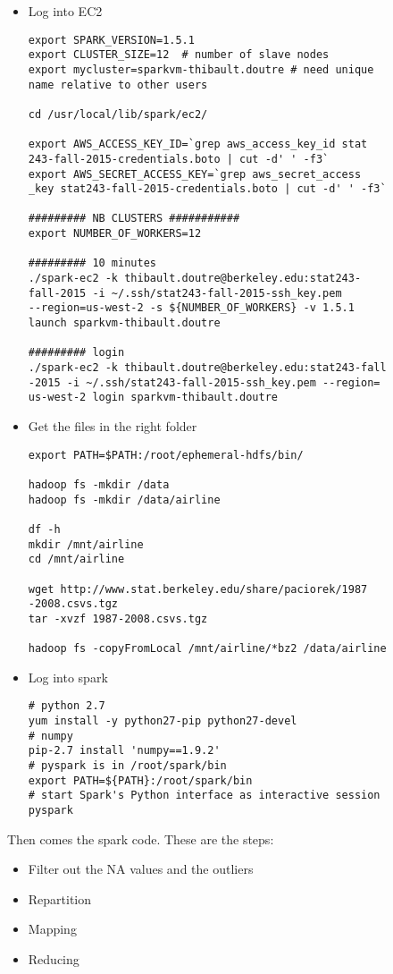 \documentclass{llncs}\usepackage[]{graphicx}\usepackage[]{color}
\begin{document}
\begin{itemize}
\item Log into EC2
\begin{lstlisting}[frame=single] 
export SPARK_VERSION=1.5.1
export CLUSTER_SIZE=12  # number of slave nodes
export mycluster=sparkvm-thibault.doutre # need unique
name relative to other users

cd /usr/local/lib/spark/ec2/

export AWS_ACCESS_KEY_ID=`grep aws_access_key_id stat
243-fall-2015-credentials.boto | cut -d' ' -f3`
export AWS_SECRET_ACCESS_KEY=`grep aws_secret_access
_key stat243-fall-2015-credentials.boto | cut -d' ' -f3`

######### NB CLUSTERS ###########
export NUMBER_OF_WORKERS=12

######### 10 minutes
./spark-ec2 -k thibault.doutre@berkeley.edu:stat243-
fall-2015 -i ~/.ssh/stat243-fall-2015-ssh_key.pem 
--region=us-west-2 -s ${NUMBER_OF_WORKERS} -v 1.5.1 
launch sparkvm-thibault.doutre

######### login
./spark-ec2 -k thibault.doutre@berkeley.edu:stat243-fall
-2015 -i ~/.ssh/stat243-fall-2015-ssh_key.pem --region=
us-west-2 login sparkvm-thibault.doutre
\end{lstlisting}
\item Get the files in the right folder
\begin{lstlisting}[frame=single] 
export PATH=$PATH:/root/ephemeral-hdfs/bin/

hadoop fs -mkdir /data
hadoop fs -mkdir /data/airline

df -h
mkdir /mnt/airline
cd /mnt/airline

wget http://www.stat.berkeley.edu/share/paciorek/1987
-2008.csvs.tgz
tar -xvzf 1987-2008.csvs.tgz

hadoop fs -copyFromLocal /mnt/airline/*bz2 /data/airline
\end{lstlisting}
\item Log into spark
\begin{lstlisting}[frame=single] 
# python 2.7
yum install -y python27-pip python27-devel
# numpy
pip-2.7 install 'numpy==1.9.2'  
# pyspark is in /root/spark/bin
export PATH=${PATH}:/root/spark/bin
# start Spark's Python interface as interactive session
pyspark
\end{lstlisting}
\end{itemize}
Then comes the spark code. These are the steps:
\begin{itemize}
\item Filter out the NA values and the outliers
\item Repartition
\item Mapping
\item Reducing
\end{itemize}
\end{document}
